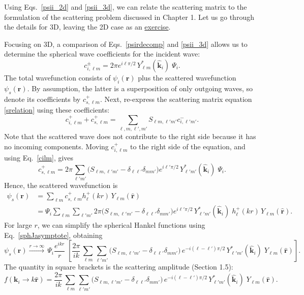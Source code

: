 \documentclass[prx,12pt]{revtex4-2}
\begin{document}
Using Eqs.~\eqref{psii_2d} and \eqref{psii_3d}, we can relate the
scattering matrix to the formulation of the scattering problem
discussed in Chapter 1.  Let us go through the details for 3D, leaving
the 2D case as an \hyperref[ex:2dscattering]{exercise}.

Focusing on 3D, a comparison of Eqs.~\eqref{psirdecomp} and
\eqref{psii_3d} allows us to determine the spherical wave coefficients
for the incident wave:
\begin{equation}
  c^{\pm}_{i, \ell m} = 2 \pi e^{i\ell\pi/2} \,
  Y_{\ell m}^*(\hat{\mathbf{k}}_i)\; \Psi_i.
  \label{cilm}
\end{equation}
The total wavefunction consists of $\psi_i(\mathbf{r})$ plus the
scattered wavefunction $\psi_s(\mathbf{r})$.  By assumption, the
latter is a superposition of only outgoing waves, so denote its
coefficients by $c^+_{s,\ell m}$.  Next, re-express the scattering
matrix equation \eqref{srelation} using these coefficients:
\begin{equation}
  c^+_{i,\ell m} + c^+_{s,\ell m}
  = \sum_{\ell, m, \ell', m'} S_{\ell m, \ell'm'} c^-_{i,\ell'm'}.
\end{equation}
Note that the scattered wave does not contribute to the right side
because it has no incoming components.  Moving $c_{i,\ell m}^+$ to the
right side of the equation, and using Eq.~\eqref{cilm}, gives
\begin{equation}
  c^+_{s,\ell m} = 2 \pi \sum_{\ell' m'} \Big(S_{\ell m, \ell' m'}
  - \delta_{\ell \ell'}\delta_{mm'}\Big) e^{i\ell'\pi/2} \,
  Y_{\ell' m'}^*(\hat{\mathbf{k}}_i)\; \Psi_i.
\end{equation}
Hence, the scattered wavefunction is
\begin{equation}
  \begin{aligned}\psi_s(\mathbf{r}) &= \sum_{\ell m} c^+_{s,\ell m} h_{\ell}^+(kr) \, Y_{\ell m}(\hat{\mathbf{r}}) \\ &= \Psi_i \sum_{\ell m} \sum_{\ell' m'} 2 \pi \Big(S_{\ell m, \ell' m'} - \delta_{\ell \ell'}\delta_{mm'}\Big) e^{i\ell'\pi/2} \, Y_{\ell' m'}^*(\hat{\mathbf{k}}_i)\; h_{\ell}^+(kr) \, Y_{\ell m}(\hat{\mathbf{r}}).\end{aligned}
\end{equation}
For large $r$, we can simplify the spherical Hankel functions using
Eq.~\eqref{sphJasymptote}, obtaining
\begin{equation}
  \psi_s(\mathbf{r}) \overset{r\rightarrow\infty}{\longrightarrow} \, \Psi_i \frac{e^{ikr}}{r} \; \left[ \frac{2 \pi}{ik}\, \sum_{\ell m} \sum_{\ell' m'} \Big(S_{\ell m, \ell' m'} - \delta_{\ell \ell'}\delta_{mm'}\Big) \, e^{-i(\ell-\ell')\pi/2} \, Y_{\ell' m'}^*(\hat{\mathbf{k}}_i)\; Y_{\ell m}(\hat{\mathbf{r}})\right].
\end{equation}
The quantity in square brackets is the scattering amplitude (Section
1.5):
\begin{equation}
  f(\mathbf{k}_i \rightarrow k\hat{\mathbf{r}}) =  \frac{2 \pi}{ik}\, \sum_{\ell m} \sum_{\ell' m'} \Big(S_{\ell m, \ell' m'} - \delta_{\ell \ell'}\delta_{mm'}\Big) \, e^{-i(\ell-\ell')\pi/2} \, Y_{\ell' m'}^*(\hat{\mathbf{k}}_i)\; Y_{\ell m}(\hat{\mathbf{r}}).
  \label{3dfrelation}
\end{equation}
\end{document}
